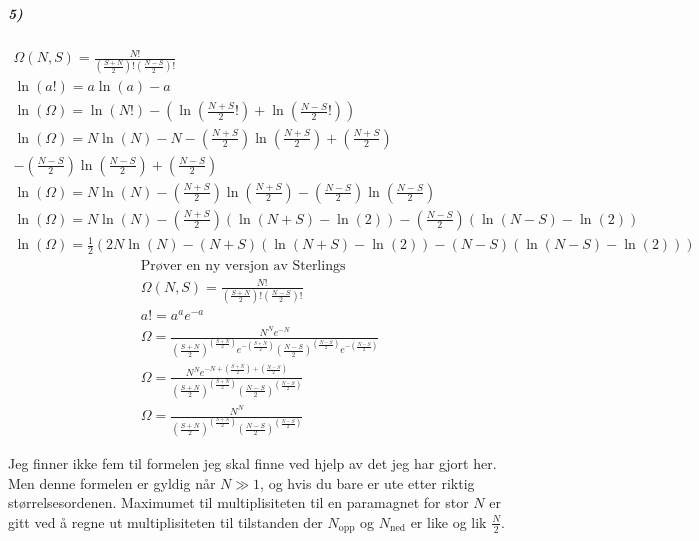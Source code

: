 \documentclass[11pt, A4paper,norsk]{article}
\begin{document}
			\subparagraph{5)}
				\begin{gather*}
\Omega (N, S) = \frac{N!}{\left( \frac{S + N}{2} \right)! \left( \frac{N - S}{2} \right)!} \\
\ln(a!) = a \ln(a) - a \\
\ln (\Omega) = \ln(N!) - \left( \ln \left( \frac{N + S}{2} ! \right) + \ln \left( \frac{N - S}{2} ! \right) \right) \\
\ln (\Omega) = N \ln(N) - N - \left( \frac{N + S}{2} \right) \ln \left( \frac{N + S}{2} \right) + \left( \frac{N + S}{2} \right) \\
- \left( \frac{N - S}{2} \right) \ln \left( \frac{N - S}{2} \right) + \left( \frac{N - S}{2} \right) \\
\ln (\Omega) = N \ln(N) - \left( \frac{N + S}{2} \right) \ln \left( \frac{N + S}{2} \right) - \left( \frac{N - S}{2} \right) \ln \left( \frac{N - S}{2} \right) \\
\ln (\Omega) = N \ln(N) - \left( \frac{N + S}{2} \right) ( \ln ( N + S ) - \ln(2) ) - \left( \frac{N - S}{2} \right) ( \ln ( N - S ) - \ln(2) ) \\
\ln (\Omega) = \frac{1}{2} \left( 2 N \ln(N) - ( N + S ) ( \ln ( N + S ) - \ln(2) ) - ( N - S ) ( \ln ( N - S ) - \ln(2) ) \right)
				\end{gather*}
				\begin{gather*}
\text{Prøver en ny versjon av Sterlings} \\
\Omega (N, S) = \frac{N!}{\left( \frac{S + N}{2} \right)! \left( \frac{N - S}{2} \right)!} \\
a! = a^a e^{-a} \\
\Omega = \frac{N^N e^{-N}}{\left( \frac{S + N}{2} \right)^{\left( \frac{S + N}{2} \right)} e^{- \left( \frac{S + N}{2} \right)} \left( \frac{N - S}{2} \right)^{\left( \frac{N - S}{2} \right)} e^{-\left( \frac{N - S}{2} \right)}} \\
\Omega = \frac{ N^N e^{- N + \left( \frac{S + N}{2} \right) + \left( \frac{N - S}{2} \right)} }{ \left( \frac{S + N}{2} \right)^{\left( \frac{S + N}{2} \right)} \left( \frac{N - S}{2} \right)^{\left( \frac{N - S}{2} \right)} } \\
\Omega = \frac{ N^N }{ \left( \frac{S + N}{2} \right)^{\left( \frac{S + N}{2} \right)} \left( \frac{N - S}{2} \right)^{\left( \frac{N - S}{2} \right)} }
				\end{gather*}
				\begin{flushleft}
Jeg finner ikke fem til formelen jeg skal finne ved hjelp av det jeg har gjort her. Men denne formelen er gyldig når $N \gg 1$, og hvis du bare er ute etter riktig størrelsesordenen.
Maximumet til multiplisiteten til en paramagnet for stor $N$ er gitt ved å regne ut multiplisiteten til tilstanden der $N_{\text{opp}}$ og $N_{\text{ned}}$ er like og lik $\frac{N}{2}$.
				\end{flushleft}
\end{document}

